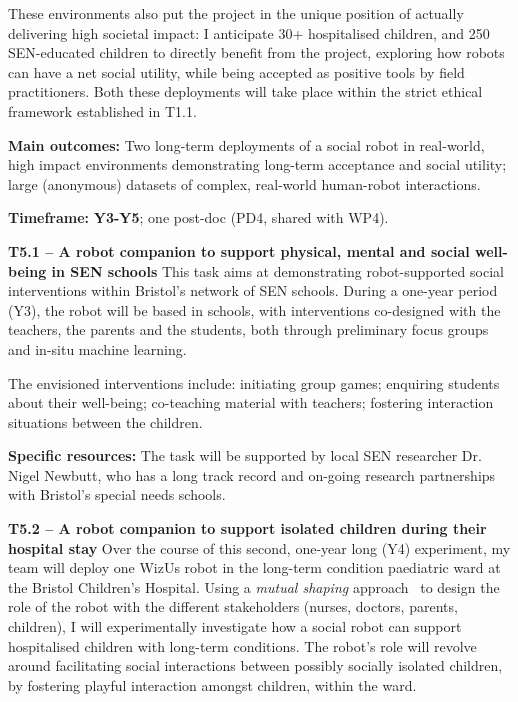 \documentclass[11pt,a4paper]{report}
\newcommand{\project}{WizUs\xspace}
\begin{document}
These environments also put the project in the unique position of actually
delivering high societal impact: I anticipate 30+ hospitalised children, and 250
SEN-educated children to directly benefit from the project, exploring how robots
can have a net social utility, while being accepted as positive tools by field
practitioners. Both these deployments will take place within the strict ethical
framework established in T1.1.

\begin{oframed}

    \textbf{Main outcomes:} Two long-term deployments of a social robot in
    real-world, high impact environments demonstrating long-term acceptance and
    social utility; large (anonymous) datasets of complex, real-world
    human-robot interactions.

    \textbf{Timeframe:} \textbf{Y3-Y5}; one post-doc (PD4, shared with WP4).

\end{oframed}

\textbf{T5.1 -- A robot companion to support physical, mental and social
well-being in SEN schools} This task aims at demonstrating robot-supported
social interventions within Bristol's network of SEN schools.  During a one-year
period (Y3), the robot will be based in schools, with interventions co-designed
with the teachers, the parents and the students, both through preliminary
focus groups and in-situ machine learning.

The envisioned interventions include: initiating group games; enquiring students
about their well-being; co-teaching material with teachers; fostering
interaction situations between the children.

\textbf{Specific resources:} The task will be supported by local SEN researcher
Dr. Nigel Newbutt, who has a long track record and on-going research
partnerships with Bristol's special needs schools.


\textbf{T5.2 -- A robot companion to support isolated children during their
hospital stay} Over the course of this second, one-year long (Y4)
experiment, my team will deploy one \project robot in the long-term condition
paediatric ward at the Bristol Children's Hospital.  Using a \emph{mutual shaping}
approach~\cite{winkle2018social} to design the role of the robot with the
different stakeholders (nurses, doctors, parents, children), I will
experimentally investigate how a social robot can support hospitalised children
with long-term conditions. The robot's role will revolve around facilitating
social interactions between possibly socially isolated children, by fostering
playful interaction amongst children, within the ward.
\end{document}
